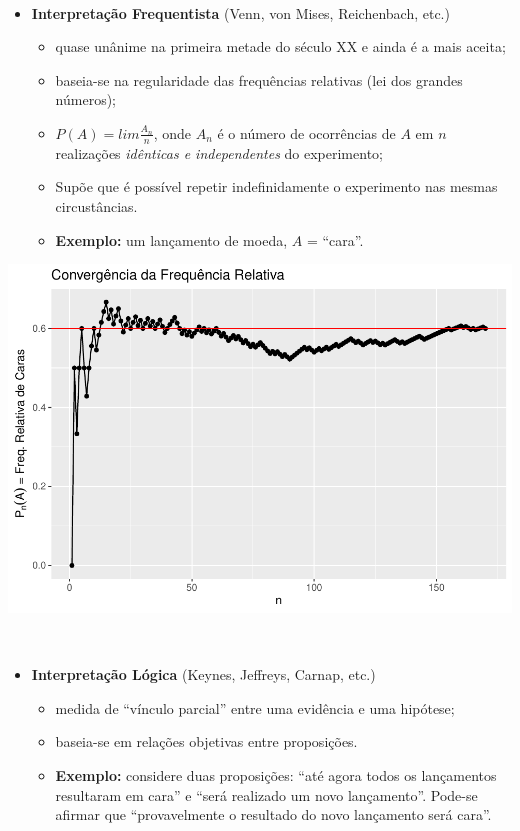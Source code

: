 \documentclass[
]{book}
\providecommand{\tightlist}{%
  \setlength{\itemsep}{0pt}\setlength{\parskip}{0pt}}
\begin{document}
\(~\)

\begin{itemize}
\tightlist
\item
  \textbf{Interpretação Frequentista} (Venn, von Mises, Reichenbach, etc.)

  \begin{itemize}
  \tightlist
  \item
    quase unânime na primeira metade do século XX e ainda é a mais aceita;
  \item
    baseia-se na regularidade das frequências relativas (lei dos grandes números);
  \item
    \(P(A) = lim \frac{A_n}{n}\), onde \(A_n\) é o número de ocorrências de \(A\) em \(n\) realizações \emph{idênticas e independentes} do experimento;
  \item
    Supõe que é possível repetir indefinidamente o experimento nas mesmas circustâncias.
  \item
    \textbf{Exemplo:} um lançamento de moeda, \(A\) = ``cara''.
  \end{itemize}
\end{itemize}

\begin{center}\includegraphics{AED_files/figure-latex/LGN-1} \end{center}

\(~\)

\begin{itemize}
\tightlist
\item
  \textbf{Interpretação Lógica} (Keynes, Jeffreys, Carnap, etc.)

  \begin{itemize}
  \tightlist
  \item
    medida de ``vínculo parcial'' entre uma evidência e uma hipótese;
  \item
    baseia-se em relações objetivas entre proposições.
  \item
    \textbf{Exemplo:} considere duas proposições: ``até agora todos os lançamentos resultaram em cara'' e ``será realizado um novo lançamento''. Pode-se afirmar que ``provavelmente o resultado do novo lançamento será cara''.
  \end{itemize}
\end{itemize}
\end{document}
